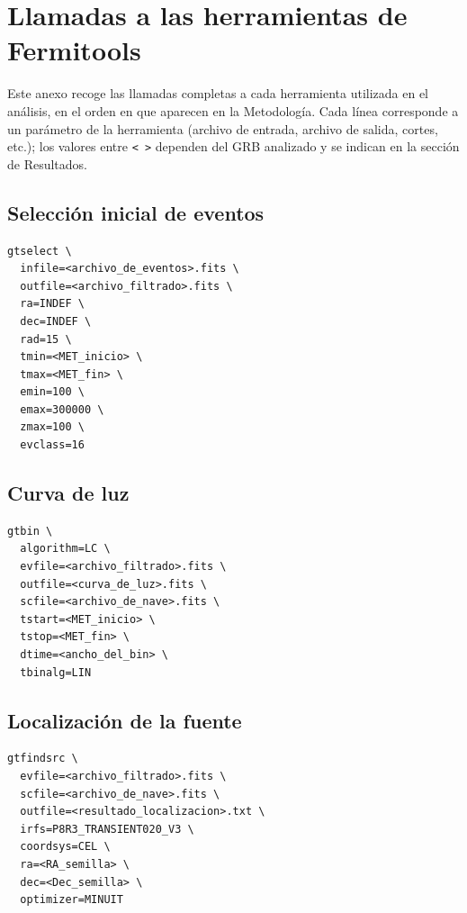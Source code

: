 \newpage
\appendix
\section{Llamadas a las herramientas de Fermitools}
\label{anexo:comandos}

Este anexo recoge las llamadas completas a cada herramienta utilizada en el análisis, en el orden en que
aparecen en la Metodología. Cada línea corresponde a un parámetro de la herramienta (archivo de entrada,
archivo de salida, cortes, etc.); los valores entre \texttt{<~>} dependen del GRB analizado y se indican
en la sección de Resultados.

\subsection{Selección inicial de eventos}
\label{an:gtselect}

\begin{lstlisting}[style=mipython]
gtselect \
  infile=<archivo_de_eventos>.fits \
  outfile=<archivo_filtrado>.fits \
  ra=INDEF \
  dec=INDEF \
  rad=15 \
  tmin=<MET_inicio> \
  tmax=<MET_fin> \
  emin=100 \
  emax=300000 \
  zmax=100 \
  evclass=16
\end{lstlisting}

\subsection{Curva de luz}
\label{an:lc}

\begin{lstlisting}[style=mipython]
gtbin \
  algorithm=LC \
  evfile=<archivo_filtrado>.fits \
  outfile=<curva_de_luz>.fits \
  scfile=<archivo_de_nave>.fits \
  tstart=<MET_inicio> \
  tstop=<MET_fin> \
  dtime=<ancho_del_bin> \
  tbinalg=LIN
\end{lstlisting}

\subsection{Localización de la fuente}
\label{an:gtfindsrc}

\begin{lstlisting}[style=mipython]
gtfindsrc \
  evfile=<archivo_filtrado>.fits \
  scfile=<archivo_de_nave>.fits \
  outfile=<resultado_localizacion>.txt \
  irfs=P8R3_TRANSIENT020_V3 \
  coordsys=CEL \
  ra=<RA_semilla> \
  dec=<Dec_semilla> \
  optimizer=MINUIT
\end{lstlisting}


